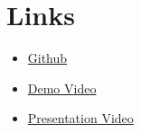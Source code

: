 \documentclass[conference]{IEEEtran}
\begin{document}

\section{Links}

\begin{itemize}
    \item \href{https://github.com/aambroo/Computer-Vision-Final-Assignment}{Github}
    \item \href{https://github.com/aambroo/Computer-Vision-Final-Assignment/tree/main/outputs}{Demo Video}
    \item \href{}{Presentation Video}
\end{itemize}



\end{document}
